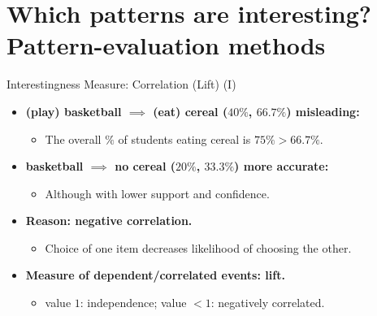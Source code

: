 \section{Which patterns are interesting? Pattern-evaluation methods}

\begin{frame}{Interestingness Measure: Correlation (Lift) (I)}
	\begin{itemize}
		\item \textbf{(play) basketball $\implies$ (eat) cereal
			      ($40\%$, $66.7\%$)  misleading:}
		      \begin{itemize}
			      \item The overall $\%$ of students eating cereal is $75\% >
				            66.7\%$.
		      \end{itemize}
		\item \textbf{basketball $\implies$ no cereal ($20\%$,
			      $33.3\%$)  more accurate:}
		      \begin{itemize}
			      \item Although with lower support and confidence.
		      \end{itemize}
		\item \textbf{Reason: negative correlation.}
		      \begin{itemize}
			      \item Choice of one item decreases likelihood of choosing
			            the other.
		      \end{itemize}
		\item \textbf{Measure of dependent/correlated events: lift.}
		      \begin{itemize}
			      \item value $1$: independence; value $< 1$: negatively
			            correlated.
		      \end{itemize}
	\end{itemize}
\end{frame}

